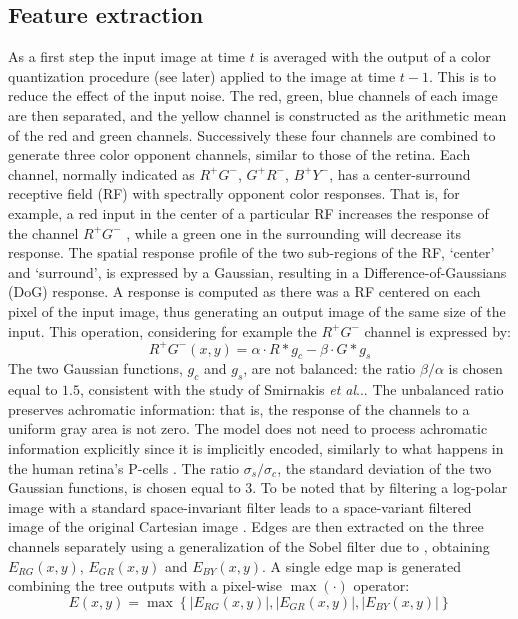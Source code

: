 \documentclass{llncs}
\makeatletter
\DeclareRobustCommand\onedot{\futurelet\@let@token\@onedot}
\def\@onedot{\ifx\@let@token.\else.\null\fi\xspace}
\def\etal{\emph{et al}\onedot}
\makeatother
\begin{document}
\subsection{Feature extraction}
As a first step the input image at time $t$ is averaged
with the output of a color quantization procedure (see
later) applied to the image at time $t-1$. This is to reduce
the effect of the input noise. The red, green, blue
channels of each image are then separated, and the
yellow channel is constructed as the arithmetic mean
of the red and green channels. Successively these four
channels are combined to generate three color
opponent channels, similar to those of the retina. Each
channel, normally indicated as $R^+G^-$, $G^+R^-$, $B^+ Y^-$,
has a center-surround receptive field (RF) with
spectrally opponent color responses. That is, for
example, a red input in the center of a particular RF
increases the response of the channel $R^+G^-$ , while a
green one in the surrounding will decrease its
response. The spatial response profile of the two sub-regions
of the RF, `center' and `surround', is expressed by a Gaussian,
resulting in a Difference-of-Gaussians (DoG) response.
A response is computed as there was a RF centered on
each pixel of the input image, thus generating an
output image of the same size of the input. This
operation, considering for example the $R^+G^-$ channel
is expressed by:
\begin{equation}
	R^+G^-(x,y)=\alpha \cdot R * g_c - \beta \cdot G * g_s
	\label{eq:dog}
\end{equation}
The two Gaussian functions, $g_c$ and $g_s$, are not
balanced: the ratio $\beta / \alpha$ is chosen equal to $1.5$,
consistent with the study of Smirnakis \etal \cite{SmirnakisBWBM97}. The
unbalanced ratio preserves achromatic information:
that is, the response of the channels to a uniform gray
area is not zero. The model does not need to
process achromatic information explicitly since it is
implicitly encoded, similarly to what happens in the
human retina's P-cells \cite{Billock95}. The ratio $\sigma_s / \sigma_c$, the
standard deviation of the two Gaussian functions, is
chosen equal to 3. To be noted that by filtering a log-polar
image with a standard space-invariant filter leads
to a space-variant filtered image of the original
Cartesian image \cite{MallotSG90}.
Edges are then extracted on the three channels
separately using a generalization of the Sobel filter due
to \cite{LiYYY03}, obtaining $E_{RG}(x,y)$, $E_{GR}(x,y)$ and $E_{BY}(x,y)$. A
single edge map is generated combining the tree
outputs with a pixel-wise $\max(\cdot)$ operator:
\begin{equation}
	E(x,y)=\max\left\{\left|E_{RG}(x,y)\right|,\left|E_{GR}(x,y)\right|,\left|E_{BY}(x,y)\right|\right\}
	\label{eq:edge_map}
\end{equation}
\end{document}
